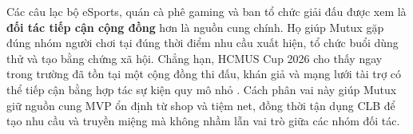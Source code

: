 Các câu lạc bộ eSports, quán cà phê gaming và ban tổ chức giải đấu được xem là \textbf{đối tác tiếp cận cộng đồng} hơn là nguồn cung chính. Họ giúp Mutux gặp đúng nhóm người chơi tại đúng thời điểm nhu cầu xuất hiện, tổ chức buổi dùng thử và tạo bằng chứng xã hội. Chẳng hạn, HCMUS Cup 2026 cho thấy ngay trong trường đã tồn tại một cộng đồng thi đấu, khán giả và mạng lưới tài trợ có thể tiếp cận bằng hợp tác sự kiện quy mô nhỏ \cite{vngHcmusCup2026}. Cách phân vai này giúp Mutux giữ nguồn cung MVP ổn định từ shop và tiệm net, đồng thời tận dụng CLB để tạo nhu cầu và truyền miệng mà không nhầm lẫn vai trò giữa các nhóm đối tác.



